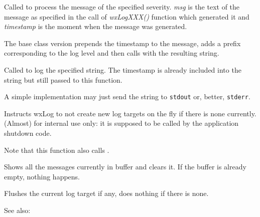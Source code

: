 \label{wxlogdolog}


Called to process the message of the specified severity. {\it msg} is the text
of the message as specified in the call of {\it wxLogXXX()} function which
generated it and {\it timestamp} is the moment when the message was generated.

The base class version prepends the timestamp to the message, adds a prefix
corresponding to the log level and then calls 
 with the resulting string.

\label{wxlogdologstring}


Called to log the specified string. The timestamp is already included into the
string but still passed to this function.

A simple implementation may just send the string to {\tt stdout} or, better, 
{\tt stderr}.

\label{wxlogdontcreateondemand}


Instructs wxLog to not create new log targets on the fly if there is none
currently. (Almost) for internal use only: it is supposed to be called by the
application shutdown code.

Note that this function also calls 
.

\label{wxlogflush}


Shows all the messages currently in buffer and clears it. If the buffer
is already empty, nothing happens.

\label{wxlogflushactive}


Flushes the current log target if any, does nothing if there is none.

See also:


\label{wxloghaspendingmessages}

